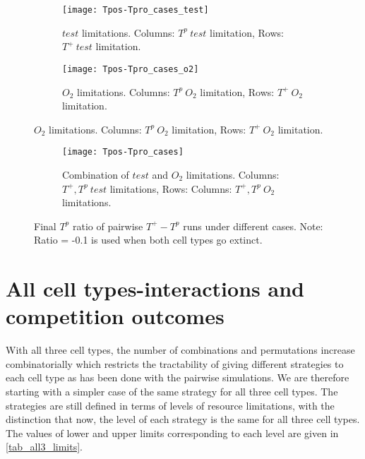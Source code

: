 \begin{figure}[h!]
  \centering
  \begin{subfigure}[b]{\textwidth}
    \centering
    \texttt{[image: Tpos-Tpro\_cases\_test]}
    \caption{$test$ limitations. Columns: $T^p\ test$ limitation, Rows: $T^+\ test$ limitation.}
    \label{fig_Tpos-Tpro_cases_test}
  \end{subfigure}
  \begin{subfigure}[b]{\textwidth}
    \centering
    \texttt{[image: Tpos-Tpro\_cases\_o2]}
    \caption{$O_2$ limitations. Columns: $T^p\ O_2$ limitation, Rows: $T^+\ O_2$ limitation.}
    \label{fig_Tpos-Tpro_cases_o2}
  \end{subfigure}
\end{figure}
\begin{figure}[h!]\ContinuedFloat
  \centering
  \begin{subfigure}[b]{\textwidth}
    \centering
    \texttt{[image: Tpos-Tpro\_cases]}
    \caption{Combination  of $test$ and $O_2$ limitations. Columns: $T^+,T^p\ test$ limitations, Rows: Columns: $T^+,T^p\ O_2$ limitations.}
    \label{fig_Tpos-Tpro_cases_combi}
  \end{subfigure}
  \caption[Final $T^p$ ratio of pairwise $T^+ - T^p$ runs under different cases]{Final $T^p$ ratio of pairwise $T^+ - T^p$ runs under different cases. Note: Ratio = -0.1 is used when both cell types go extinct.}
  \label{fig_Tpos-Tpro_cases}
\end{figure}

\chapter{All cell types-interactions and competition outcomes}
With all three cell types, the number of combinations and permutations increase combinatorially which restricts the tractability of giving different strategies to each cell type as has been done with the pairwise simulations. We are therefore starting with a simpler case of the same strategy for all three cell types. The strategies are still defined in terms of levels of resource limitations, with the distinction that now, the level of each strategy is the same for all three cell types. The values of lower and upper limits corresponding to each level are given in \autoref{tab_all3_limits}.


